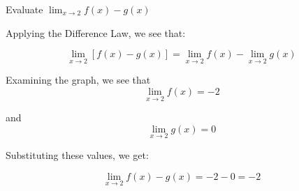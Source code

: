 \begin{Worked}
\begin{Problem}
Evaluate $\lim_{x\to2}f(x) - g(x)$
\end{Problem}
\begin{Solution}
Applying the Difference Law, we see that:

$$\lim_{x\to2}[f(x) - g(x)] = \lim_{x\to2}f(x) - \lim_{x\to2}g(x)$$

Examining the graph, we see that 
$$\lim_{x\to2}f(x) = -2$$ 

and 
$$\lim_{x\to2}g(x) = 0$$

Substituting these values, we get:

$$\lim_{x\to2}f(x) - g(x) = -2 - 0 = -2$$
\end{Solution}
\end{Worked}

